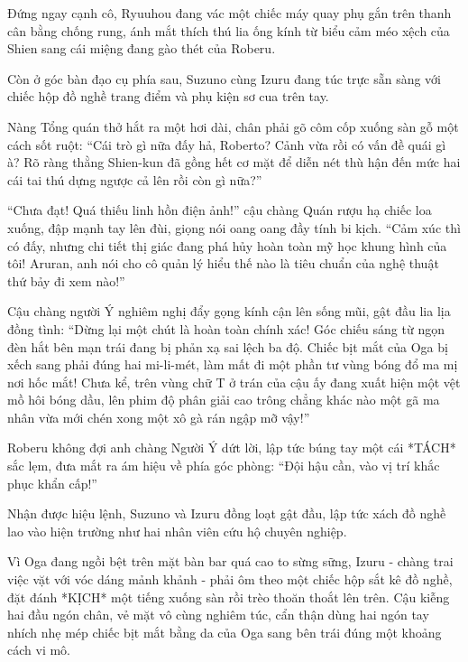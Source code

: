 \documentclass[../main.tex]{subfiles}
\begin{document}
Đứng ngay cạnh cô, Ryuuhou đang vác một chiếc máy quay phụ gắn trên thanh cân bằng chống rung, ánh mắt thích thú lia ống kính từ biểu cảm méo xệch của Shien sang cái miệng đang gào thét của Roberu.

Còn ở góc bàn đạo cụ phía sau, Suzuno cùng Izuru đang túc trực sẵn sàng với chiếc hộp đồ nghề trang điểm và phụ kiện sơ cua trên tay.


Nàng Tổng quán thở hắt ra một hơi dài, chân phải gõ côm cốp xuống sàn gỗ một cách sốt ruột: ``Cái trò gì nữa đấy hả, Roberto? Cảnh vừa rồi có vấn đề quái gì à? Rõ ràng thằng Shien-kun đã gồng hết cơ mặt để diễn nét thù hận đến mức hai cái tai thú dựng ngược cả lên rồi còn gì nữa?''

``Chưa đạt! Quá thiếu linh hồn điện ảnh!'' cậu chàng Quán rượu hạ chiếc loa xuống, đập mạnh tay lên đùi, giọng nói oang oang đầy tính bi kịch. ``Cảm xúc thì có đấy, nhưng chi tiết thị giác đang phá hủy hoàn toàn mỹ học khung hình của tôi! Aruran, anh nói cho cô quản lý hiểu thế nào là tiêu chuẩn của nghệ thuật thứ bảy đi xem nào!''

Cậu chàng người Ý nghiêm nghị đẩy gọng kính cận lên sống mũi, gật đầu lia lịa đồng tình: ``Dừng lại một chút là hoàn toàn chính xác! Góc chiếu sáng từ ngọn đèn hắt bên mạn trái đang bị phản xạ sai lệch ba độ. Chiếc bịt mắt của Oga bị xếch sang phải đúng hai mi-li-mét, làm mất đi một phần tư vùng bóng đổ ma mị nơi hốc mắt! Chưa kể, trên vùng chữ T ở trán của cậu ấy đang xuất hiện một vệt mồ hôi bóng dầu, lên phim độ phân giải cao trông chẳng khác nào một gã ma nhân vừa mới chén xong một xô gà rán ngập mỡ vậy!''

Roberu không đợi anh chàng Người Ý dứt lời, lập tức búng tay một cái *TÁCH* sắc lẹm, đưa mắt ra ám hiệu về phía góc phòng: ``Đội hậu cần, vào vị trí khắc phục khẩn cấp!''

Nhận được hiệu lệnh, Suzuno và Izuru đồng loạt gật đầu, lập tức xách đồ nghề lao vào hiện trường như hai nhân viên cứu hộ chuyên nghiệp.

Vì Oga đang ngồi bệt trên mặt bàn bar quá cao to sừng sững, Izuru - chàng trai việc vặt với vóc dáng mảnh khảnh - phải ôm theo một chiếc hộp sắt kê đồ nghề, đặt đánh *KỊCH* một tiếng xuống sàn rồi trèo thoăn thoắt lên trên. Cậu kiễng hai đầu ngón chân, vẻ mặt vô cùng nghiêm túc, cẩn thận dùng hai ngón tay nhích nhẹ mép chiếc bịt mắt bằng da của Oga sang bên trái đúng một khoảng cách vi mô.

\end{document}
